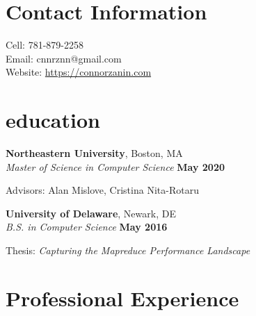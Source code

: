 \documentclass[margin,line]{resume}
\newif\ifReferences
\newif\ifOnline
\begin{document}
\Referencesfalse
\Onlinefalse


\begin{resume}


\section{\mysidestyle Contact Information}
\ifOnline
	Email: cnnrznn@gmail.com	 							\hfill Boston, MA\\
\else
   	\mbox{} \hfill Cell: 781-879-2258\\
   	\mbox{} \hfill Email: cnnrznn@gmail.com\\
    \mbox{} \hfill Website: \url{https://connorzanin.com}\\
\fi
   


\section{\mysidestyle education}
\textbf{Northeastern University}, Boston, MA \vspace{1mm}\\%
\textsl{Master of Science in Computer Science} \hfill \textbf{May 2020}
\vspace{-3mm}\\\vspace{-1mm}%
\begin{list2}
	\item Advisors: Alan Mislove, Cristina Nita-Rotaru
\end{list2}

\textbf{University of Delaware}, Newark, DE \vspace{1mm}\\%
\textsl{B.S. in Computer Science} \hfill \textbf{May 2016}\vspace{-3mm}\\\vspace{-1mm}%
\begin{list2}
    \item Thesis: \textsl{Capturing the Mapreduce Performance Landscape}
\end{list2}\vspace{-1.5mm}




\section{\mysidestyle Professional Experience}


\end{resume}
\end{document}
